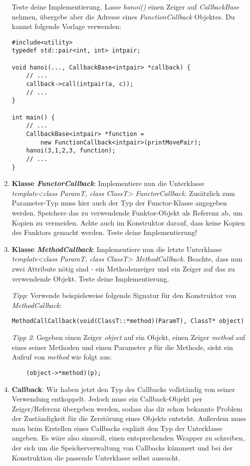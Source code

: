 \begin{enumerate}
Teste deine Implementierung.
Lasse \emph{hanoi()} einen Zeiger auf \emph{CallbackBase} nehmen, übergebe aber die Adresse eines \emph{FunctionCallback} Objektes.
Du kannst folgende Vorlage verwenden:
\begin{lstlisting}
#include<utility>
typedef std::pair<int, int> intpair;

void hanoi(..., CallbackBase<intpair> *callback) {
	// ...
	callback->call(intpair(a, c));
	// ...
}

int main() {
	// ...
	CallbackBase<intpair> *function = 
	    new FunctionCallback<intpair>(printMovePair);
	hanoi(3,1,2,3, function);
	// ...
}
\end{lstlisting}


\item
\textbf{Klasse \emph{FunctorCallback}}:
Implementiere nun die Unterklasse \emph{template<class ParamT, class ClassT> FunctorCallback}.
Zusätzlich zum Parameter-Typ muss hier auch der Typ der Functor-Klasse angegeben werden.
Speichere das zu verwendende Funktor-Objekt als Referenz ab, um Kopien zu vermeiden.
Achte auch im Konstruktor darauf, dass keine Kopien des Funktors gemacht werden.
Teste deine Implementierung! 



\item
\textbf{Klasse \emph{MethodCallback}}:
Implementiere nun die letzte Unterklasse \emph{template<class ParamT, class ClassT> MethodCallback}.
Beachte, dass nun zwei Attribute nötig sind - ein Methodenzeiger und ein Zeiger auf das zu verwendende Objekt.
Teste deine Implementierung.

\emph{Tipp}: Verwende beispielsweise folgende Signatur für den Konstruktor von \emph{MethodCallback}:
\begin{lstlisting}
MethodCallCallback(void(ClassT::*method)(ParamT), ClassT* object)
\end{lstlisting}

\emph{Tipp 2}: Gegeben einen Zeiger \emph{object} auf ein Objekt, einen Zeiger \emph{method} auf eines seiner Methoden und einen Parameter \emph{p} für die Methode, sieht ein Aufruf von \emph{method} wie folgt aus:
\begin{lstlisting}
	(object->*method)(p);
\end{lstlisting}

\item
\textbf{Callback}: 
Wir haben jetzt den Typ des Callbacks vollständig von seiner Verwendung entkoppelt.
Jedoch muss ein Callback-Objekt per Zeiger/Referenz übergeben werden, sodass das dir schon bekannte  Problem der Zuständigkeit für die Zerstörung eines Objekts entsteht.
Außerdem muss man beim Erstellen eines Callbacks explizit den Typ der Unterklasse angeben.
Es wäre also sinnvoll, einen entsprechenden Wrapper zu schreiben, der sich um die Speicherverwaltung von Callbacks kümmert und bei der Konstruktion  die passende Unterklasse selbst aussucht.


\end{enumerate}
